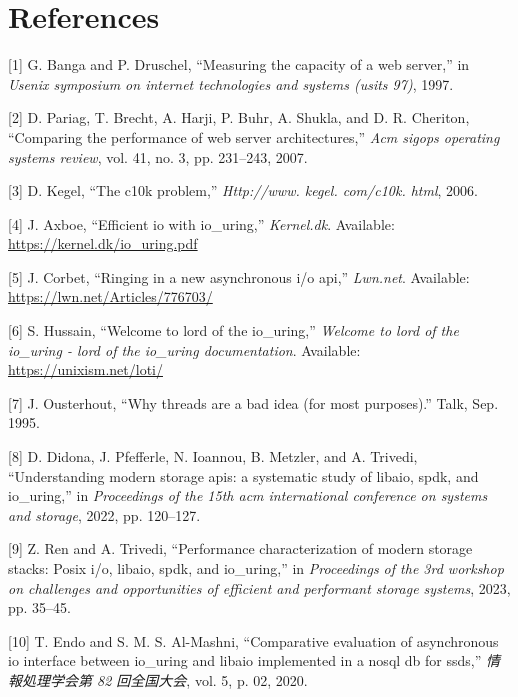 \documentclass[conference]{IEEEtran}{article}
\begin{document}
\section{References}
\label{sec:orgadb1f13}
\begin{hangparas}{1.5em}{1}
\hypertarget{citeproc_bib_item_1}{[1] G. Banga and P. Druschel, “Measuring the capacity of a web server,” in \textit{Usenix symposium on internet technologies and systems (usits 97)}, 1997.}

\hypertarget{citeproc_bib_item_2}{[2] D. Pariag, T. Brecht, A. Harji, P. Buhr, A. Shukla, and D. R. Cheriton, “Comparing the performance of web server architectures,” \textit{Acm sigops operating systems review}, vol. 41, no. 3, pp. 231–243, 2007.}

\hypertarget{citeproc_bib_item_3}{[3] D. Kegel, “The c10k problem,” \textit{Http://www. kegel. com/c10k. html}, 2006.}

\hypertarget{citeproc_bib_item_4}{[4] J. Axboe, “Efficient io with io\_uring,” \textit{Kernel.dk}. Available: \url{https://kernel.dk/io_uring.pdf}}

\hypertarget{citeproc_bib_item_5}{[5] J. Corbet, “Ringing in a new asynchronous i/o api,” \textit{Lwn.net}. Available: \url{https://lwn.net/Articles/776703/}}

\hypertarget{citeproc_bib_item_6}{[6] S. Hussain, “Welcome to lord of the io\_uring,” \textit{Welcome to lord of the io\_uring - lord of the io\_uring documentation}. Available: \url{https://unixism.net/loti/}}

\hypertarget{citeproc_bib_item_7}{[7] J. Ousterhout, “Why threads are a bad idea (for most purposes).” Talk, Sep. 1995.}

\hypertarget{citeproc_bib_item_8}{[8] D. Didona, J. Pfefferle, N. Ioannou, B. Metzler, and A. Trivedi, “Understanding modern storage apis: a systematic study of libaio, spdk, and io\_uring,” in \textit{Proceedings of the 15th acm international conference on systems and storage}, 2022, pp. 120–127.}

\hypertarget{citeproc_bib_item_9}{[9] Z. Ren and A. Trivedi, “Performance characterization of modern storage stacks: Posix i/o, libaio, spdk, and io\_uring,” in \textit{Proceedings of the 3rd workshop on challenges and opportunities of efficient and performant storage systems}, 2023, pp. 35–45.}

\hypertarget{citeproc_bib_item_10}{[10] T. Endo and S. M. S. Al-Mashni, “Comparative evaluation of asynchronous io interface between io\_uring and libaio implemented in a nosql db for ssds,” \textit{情報処理学会第 82 回全国大会}, vol. 5, p. 02, 2020.}


\end{hangparas}
\end{document}

